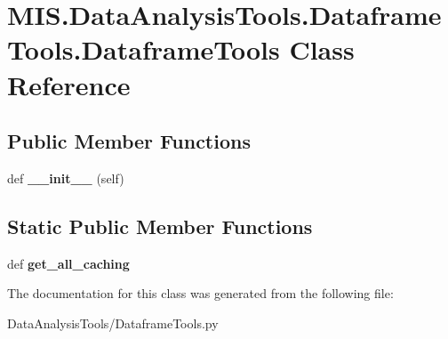 \hypertarget{classMIS_1_1DataAnalysisTools_1_1DataframeTools_1_1DataframeTools}{}\section{M\+I\+S.\+Data\+Analysis\+Tools.\+Dataframe\+Tools.\+Dataframe\+Tools Class Reference}
\label{classMIS_1_1DataAnalysisTools_1_1DataframeTools_1_1DataframeTools}
\subsection*{Public Member Functions}
\begin{DoxyCompactItemize}
\item 
\mbox{\label{classMIS_1_1DataAnalysisTools_1_1DataframeTools_1_1DataframeTools_ab98d23edbdcea164a96e54851dd08841}} 
def {\bfseries \+\_\+\+\_\+init\+\_\+\+\_\+} (self)
\end{DoxyCompactItemize}
\subsection*{Static Public Member Functions}
\begin{DoxyCompactItemize}
\item 
\mbox{\label{classMIS_1_1DataAnalysisTools_1_1DataframeTools_1_1DataframeTools_a84a4158900079f1d5cea932a70dda8a9}} 
def {\bfseries get\+\_\+all\+\_\+caching}
\end{DoxyCompactItemize}


The documentation for this class was generated from the following file\+:\begin{DoxyCompactItemize}
\item 
Data\+Analysis\+Tools/Dataframe\+Tools.\+py\end{DoxyCompactItemize}
